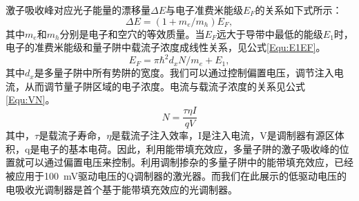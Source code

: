 激子吸收峰对应光子能量的漂移量$\Delta E$与电子准费米能级$E_F$的关系如下式所示\cite{livescu1988free}：
\begin{equation}
\label{Equ:DEEF}
\Delta E = (1+m_e/m_h)E_F,
\end{equation}
其中$m_e$和$m_h$分别是电子和空穴的等效质量。当$E_F$远大于导带中最低的能级$E_1$时，电子的准费米能级和量子阱中载流子浓度成线性关系，见公式\ref{Equ:E1EF}\cite{coldren1995diode}。
\begin{equation}
\label{Equ:E1EF}
E_F = \pi\hbar^2d_xN/m_e+E_1,
\end{equation}
其中$d_x$是多量子阱中所有势阱的宽度\textsl{}。我们可以通过控制偏置电压，调节注入电流，从而调节量子阱区域的电子浓度。电流与载流子浓度的关系见公式\ref{Equ:VN}。
\begin{equation}
\label{Equ:VN}
N = \frac{\tau\eta I}{qV}
\end{equation}
其中，$\tau$是载流子寿命，$\eta$是载流子注入效率，I是注入电流，V是调制器有源区体积，q是电子的基本电荷。因此，利用能带填充效应，多量子阱的激子吸收峰的位置就可以通过偏置电压来控制。利用调制掺杂的多量子阱中的能带填充效应，已经被应用于100~mV驱动电压的Q调制器的激光器\cite{kalinovsky1993free}。而我们在此展示的低驱动电压的电吸收光调制器是首个基于能带填充效应的光调制器。

